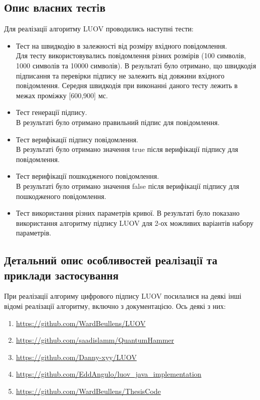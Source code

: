 \subsection{Опис власних тестiв}

Для реалізації алгоритму LUOV проводились наступні тести:

\begin{itemize}[label={$\bullet$}]
    \item Тест на швидкодію в залежності від розміру вхідного повідомлення. \\
    Для тесту використовувались повідомлення різних розмірів (100 символів, 1000 символів та 10000 символів). В результаті було отримано, що швидкодія підписання та перевірки підпису не залежить від довжини вхідного повідомлення. Середня швидкодія при виконанні даного тесту лежить в межах проміжку [600,900] мс.
    \item Тест генерації підпису. \\
    В результаті було отримано правильний підпис для повідомлення.
    \item Тест верифікації підпису повідомлення. \\
    В результаті було отримано значення true після верифікації підпису для повідомлення.
    \item Тест верифікації пошкодженого повідомлення. \\
    В результаті було отримано значення false після верифікації підпису для пошкодженого повідомлення.
    \item Тест використання різних параметрів кривої.
    В результаті було показано використання алгоритму підпису LUOV для 2-ох можливих варіантів набору параметрів.
\end{itemize}

\subsection{Детальний опис особливостей реалiзацiї та приклади застосування}

При реалізації алгориму цифрового підпису LUOV посилалися на деякі інші відомі реалізації алгоритму, включно з документацією. Ось деякі з них:
\begin{enumerate}
    \item \url{https://github.com/WardBeullens/LUOV}
    \item \url{https://github.com/saadislamm/QuantumHammer}
    \item \url{https://github.com/Danny-xyy/LUOV}
    \item \url{https://github.com/EddAngulo/luov_java_implementation}
    \item \url{https://github.com/WardBeullens/ThesisCode}
\end{enumerate}


